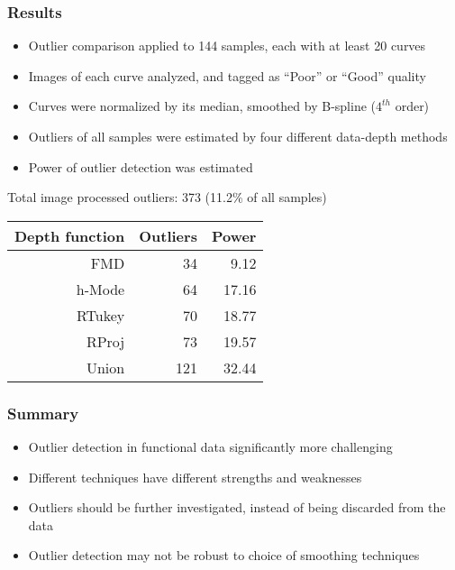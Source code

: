 \documentclass[10pt,dvipsnames,table]{beamer}
\begin{document}
\begin{frame}
\frametitle{Results}
\begin{itemize}
\item Outlier comparison applied to 144 samples, each with at least 20 curves
\item Images of each curve analyzed, and tagged as ``Poor'' or ``Good'' quality
\item Curves were normalized by its median, smoothed by B-spline ($4^{th}$ order)
\item Outliers of all samples were estimated by four different data-depth methods
\item Power of outlier detection was estimated
\end{itemize}
Total image processed outliers: 373 (11.2\% of all samples) \\
\begin{table}[ht]
\centering
\begin{tabular}{rrr}
  \hline
  \hline
  Depth function & Outliers & Power \\ 
  \hline
  FMD & 34 & 9.12 \\ 
  h-Mode & 64 & 17.16 \\ 
  RTukey & 70 & 18.77 \\ 
  RProj & 73 & 19.57 \\ 
  Union & 121 & 32.44 \\ 
  \hline
  \hline
\end{tabular}
\end{table}
\end{frame}

\begin{frame}
\frametitle{Summary}
\begin{itemize}
\item Outlier detection in functional data significantly more challenging
\item Different techniques have different strengths and weaknesses
\item Outliers should be further investigated, instead of being discarded from the data
\item Outlier detection may not be robust to choice of smoothing techniques
\end{itemize}

\end{frame}
\end{document}
